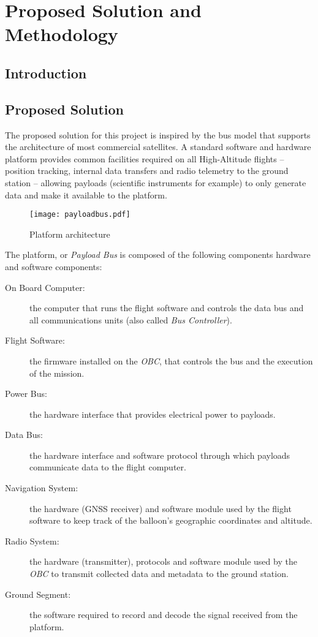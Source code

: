 \chapter{Proposed Solution and Methodology}
\label{ch:methodology}

\section{Introduction}

\section{Proposed Solution}

The proposed solution for this project is inspired by the bus model that
supports the architecture of most commercial satellites. A standard software
and hardware platform provides common facilities required on all High-Altitude
flights – position tracking, internal data transfers and radio telemetry to the
ground station – allowing payloads (scientific instruments for example) to
only generate data and make it available to the platform.

\begin{figure}[H]
\texttt{[image: payloadbus.pdf]}
\centering
\caption{Platform architecture}
\end{figure}

The platform, or \textit{Payload Bus} is composed of the following components 
hardware and software components:

\begin{description}
    
\item[On Board Computer:] the computer that runs the flight software and
controls the data bus and all communications units (also called
\textit{Bus Controller}).

\item[Flight Software:] the firmware installed on the \textit{OBC}, that
controls the bus and the execution of the mission.

\item[Power Bus:] the hardware interface that provides electrical power to
payloads.

\item[Data Bus:] the hardware interface and software protocol through which
payloads communicate data to the flight computer.

\item[Navigation System:] the hardware (GNSS receiver) and software module used
by the flight software to keep track of the balloon's geographic coordinates and
altitude.

\item[Radio System:] the hardware (transmitter), protocols and software module
used by the \textit{OBC} to transmit collected data and metadata to the
ground station.

\item[Ground Segment:] the software required to record and decode the signal
received from the platform.
    
\end{description}


